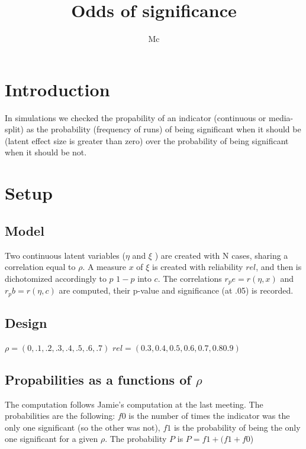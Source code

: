 \documentclass{article}
\begin{document}


\title{Odds of significance}

\author{Mc}
\maketitle
\section*{Introduction}
In simulations we checked the propability of an indicator (continuous or media-split) as the probability (frequency of runs) of being significant when it should be (latent effect size is greater than zero) over the probability of being significant when it should be not.
\section*{Setup}
\subsection*{Model}
Two continuous latent variables (\(\eta\) and \(\xi\) ) are created with N cases, sharing a correlation equal to \(\rho\). A measure \(x\) of \(\xi\) is created with reliability \(rel\), and then  is dichotomized accordingly to \(p\) \(1-p\) into \(c\). The correlations \( r_pe=r(\eta,x) \)  and \( r_pb=r(\eta,c) \) are computed, their p-value and significance (at .05) is recorded.
\subsection*{Design}
\(\rho=(0,.1,.2,.3,.4,.5,.6,.7) \)
\(rel=(0.3, 0.4 ,0.5, 0.6, 0.7 ,0.8 0.9) \) 

\subsection*{Propabilities as a functions of \(\rho\)}

The computation follows Jamie's computation at the last meeting. The probabilities are the following: \(f0\) is the number of times the indicator was the only one significant (so the other was not), \(f1\) is the probability of being the only one significant for a given \(\rho\). The probability \(P\) is \(P=f1+(f1+f0\))  
\end{document}
